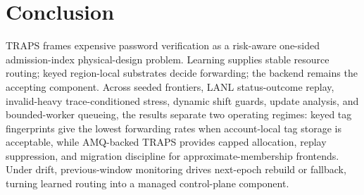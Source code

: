 \section{Conclusion}

TRAPS frames expensive password verification as a risk-aware one-sided admission-index physical-design problem. Learning supplies stable resource routing; keyed region-local substrates decide forwarding; the backend remains the accepting component. Across seeded frontiers, LANL status-outcome replay, invalid-heavy trace-conditioned stress, dynamic shift guards, update analysis, and bounded-worker queueing, the results separate two operating regimes: keyed tag fingerprints give the lowest forwarding rates when account-local tag storage is acceptable, while AMQ-backed TRAPS provides capped allocation, replay suppression, and migration discipline for approximate-membership frontends. Under drift, previous-window monitoring drives next-epoch rebuild or fallback, turning learned routing into a managed control-plane component.
